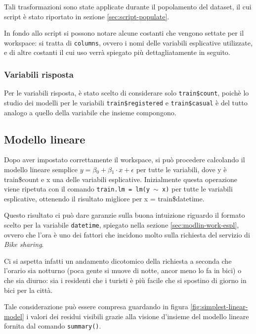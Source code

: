 Tali trasformazioni sono state applicate durante il popolamento del dataset, il
cui script è stato riportato in sezione \ref{sec:script-populate}.

In fondo allo script si possono notare alcune costanti che vengono settate per
il workspace: si tratta di \texttt{columns}, ovvero i nomi delle variabili
esplicative utilizzate, e di altre costanti il cui uso verrà spiegato più
dettagliatamente in seguito.

\subsubsection{Variabili risposta}
Per le variabili risposta, è stato scelto di considerare solo
\texttt{train\$count}, poichè lo studio dei modelli per le variabili
\texttt{train\$registered} e \texttt{train\$casual} è del tutto analogo a
quello della variabile che insieme compongono.


\subsection{Modello lineare}\label{sec:mod-lin}
Dopo aver impostato correttamente il workspace, si può procedere calcolando il
modello lineare semplice $ y = \beta{}_0 + \beta{}_1 \cdot{} x + \epsilon{} $
per tutte le variabili, dove y è train\$count e x una delle variabili
esplicative.
Inizialmente questa operazione viene ripetuta con il comando \texttt{train.lm
= lm(y $ \sim{} $ x)} per tutte le variabili esplicative, ottenendo il
risultato migliore per x = train\$datetime.

Questo risultato ci può dare garanzie sulla buona intuizione riguardo il
formato scelto per la variabile \texttt{datetime}, spiegato nella sezione
\ref{sec:modlin-work-espl}, ovvero che l'ora è uno dei fattori che incidono
molto sulla richiesta del servizio di \emph{Bike sharing}.

Ci si aspetta infatti un andamento dicotomico della richiesta a seconda che
l'orario sia notturno (poca gente si muove di notte, ancor meno lo fa in bici)
o che sia diurno: sia i residenti che i turisti è più facile che si spostino di
giorno in bici per la città.

Tale considerazione può essere compresa guardando in figura
\ref{fig:simplest-linear-model} i valori dei residui visibili grazie alla
visione d'insieme del modello lineare fornita dal comando \texttt{summary()}.

